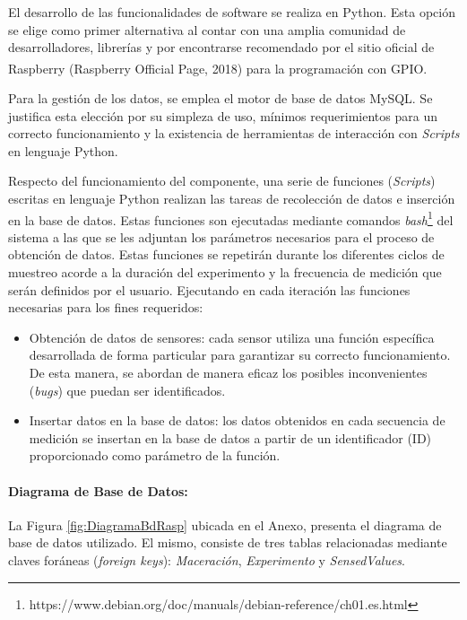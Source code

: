                \par El desarrollo de las funcionalidades de software se realiza en Python. Esta opción se elige como primer alternativa al contar con una amplia comunidad de desarrolladores, librerías y por encontrarse recomendado por el sitio oficial de Raspberry\textsuperscript{\textregistered} (Raspberry\textsuperscript{\textregistered} Official Page, 2018) para la programación con GPIO.
                
               \par Para la gestión de los datos, se emplea el motor de base de datos MySQL. Se justifica esta elección por su simpleza de uso, mínimos requerimientos para un correcto funcionamiento y la existencia de herramientas de interacción con \textit{Scripts} en lenguaje Python.
                
               \par Respecto del funcionamiento del componente, una serie de funciones (\textit{Scripts}) escritas en lenguaje Python realizan las tareas de recolección de datos e inserción en la base de datos. Estas funciones son ejecutadas mediante comandos \textit{bash}\footnote{https://www.debian.org/doc/manuals/debian-reference/ch01.es.html} del sistema a las que se les adjuntan los parámetros necesarios para el proceso de obtención de datos. Estas funciones se repetirán durante los diferentes ciclos de muestreo acorde a la duración del experimento y la frecuencia de medición que serán definidos por el usuario. Ejecutando en cada iteración las funciones necesarias para los fines requeridos:
                    
                    \begin{itemize}
                        \item Obtención de datos de sensores: cada sensor utiliza una función específica desarrollada de forma particular para garantizar su correcto funcionamiento. De esta manera, se abordan de manera eficaz los posibles inconvenientes (\textit{bugs}) que puedan ser identificados.
                        
                        \item Insertar datos en la base de datos: los datos obtenidos en cada secuencia de medición se insertan en la base de datos a partir de un identificador (ID) proporcionado como parámetro de la función.
                    \end{itemize}
                
               \paragraph{Diagrama de Base de Datos:} La Figura \ref{fig:DiagramaBdRasp} ubicada en el Anexo, presenta el diagrama de base de datos utilizado. El mismo, consiste de tres tablas relacionadas mediante claves foráneas (\textit{foreign keys}): \textit{Maceración}, \textit{Experimento} y \textit{SensedValues}. 
                

